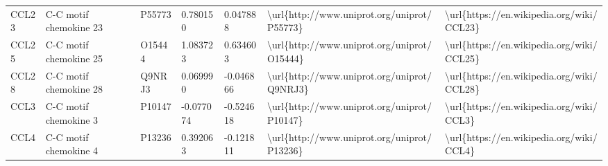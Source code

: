 \begin{table}[]
\begin{tabular}{lllllll}
\multicolumn{1}{l|}{CCL23}    & C-C motif chemokine 23                                        & P55773  & 0.780150           & 0.047888          & \textbackslash{}url\{http://www.uniprot.org/uniprot/P55773\} & \textbackslash{}url\{https://en.wikipedia.org/wiki/CCL23\}                                                                                                                                                                                                                                         \\
\multicolumn{1}{l|}{CCL25}    & C-C motif chemokine 25                                        & O15444  & 1.083723           & 0.634603          & \textbackslash{}url\{http://www.uniprot.org/uniprot/O15444\} & \textbackslash{}url\{https://en.wikipedia.org/wiki/CCL25\}                                                                                                                                                                                                                                         \\
\multicolumn{1}{l|}{CCL28}    & C-C motif chemokine 28                                        & Q9NRJ3  & 0.069990           & -0.046866         & \textbackslash{}url\{http://www.uniprot.org/uniprot/Q9NRJ3\} & \textbackslash{}url\{https://en.wikipedia.org/wiki/CCL28\}                                                                                                                                                                                                                                         \\
\multicolumn{1}{l|}{CCL3}     & C-C motif chemokine 3                                         & P10147  & -0.077074          & -0.524618         & \textbackslash{}url\{http://www.uniprot.org/uniprot/P10147\} & \textbackslash{}url\{https://en.wikipedia.org/wiki/CCL3\}                                                                                                                                                                                                                                          \\
\multicolumn{1}{l|}{CCL4}     & C-C motif chemokine 4                                         & P13236  & 0.392063           & -0.121811         & \textbackslash{}url\{http://www.uniprot.org/uniprot/P13236\} & \textbackslash{}url\{https://en.wikipedia.org/wiki/CCL4\}                                                                                                                                                                                                                                          \\

\end{tabular}
\end{table}
